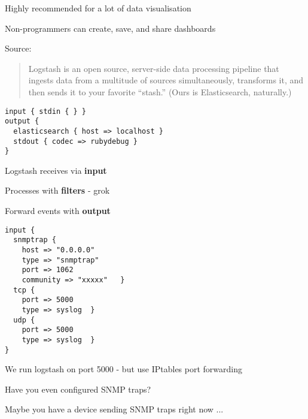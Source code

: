 \documentclass[Screen16to9,17pt]{foils}
\begin{document}


\centerline{Highly recommended for a lot of data visualisation}

Non-programmers can create, save, and share dashboards

Source:




\begin{quote}
  Logstash is an open source, server-side data processing pipeline that ingests data from a multitude of sources simultaneously, transforms it, and then sends it to your favorite “stash.” (Ours is Elasticsearch, naturally.)\\
\end{quote}

\begin{verbatim}
input { stdin { } }
output {
  elasticsearch { host => localhost }
  stdout { codec => rubydebug }
}
\end{verbatim}



\begin{list2}
\item Logstash receives via {\bf input}
\item Processes with {\bf filters} - grok
\item Forward events with {\bf output}
\end{list2}




{\footnotesize
\begin{verbatim}
input {
  snmptrap {
    host => "0.0.0.0"
    type => "snmptrap"
    port => 1062
    community => "xxxxx"   }
  tcp {
    port => 5000
    type => syslog  }
  udp {
    port => 5000
    type => syslog  }
}
\end{verbatim}
}

\begin{list2}
\item We run logstash on port 5000 - but use IPtables port forwarding
\item Have you even configured SNMP traps?
\item Maybe you have a device sending SNMP traps right now ...
\end{list2}
\end{document}
